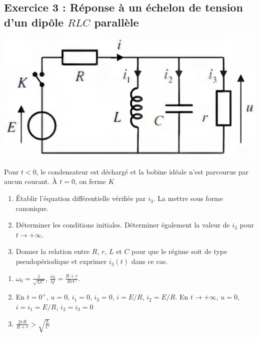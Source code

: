 \subsection{Exercice 3 : Réponse à un échelon de tension d'un dipôle $RLC$ parallèle}

\begin{minipage}[c]{\linewidth/2}
	\includegraphics[width=\textwidth]{./Images/mpsi_s08_ex03.png}
\end{minipage}%
\begin{minipage}[c]{\linewidth/2}
	Pour $t<0$, le condensateur est déchargé et la bobine idéale n'est parcourue par aucun courant. À $t=0$, on ferme $K$
\end{minipage}

\begin{enumerate}
	\item Établir l'équation différentielle vérifiée par $i_3$. La mettre sous forme canonique.
	\item Déterminer les conditions initiales. Déterminer également la valeur de $i_3$ pour $t\rightarrow+\infty$.
	\item Donner la relation entre $R$, $r$, $L$ et $C$ pour que le régime soit de type pseudopériodique et exprimer $i_3(t)$ dans ce cas.
\end{enumerate}

\begin{enumerate}
	\item $\omega_0 = \frac{1}{\sqrt{LC}}$, $\frac{\omega_0}{Q} = \frac{R + r}{RrC}$.
	\item En $t=0^+$, $u=0$, $i_1=0$, $i_3=0$, $i=E/R$, $i_2=E/R$. En $t\rightarrow+\infty$, $u=0$, $i=i_1=E/R$, $i_2=i_3=0$
	\item $\frac{2rR}{R+r} > \sqrt{\frac{L}{C}}$
\end{enumerate}

